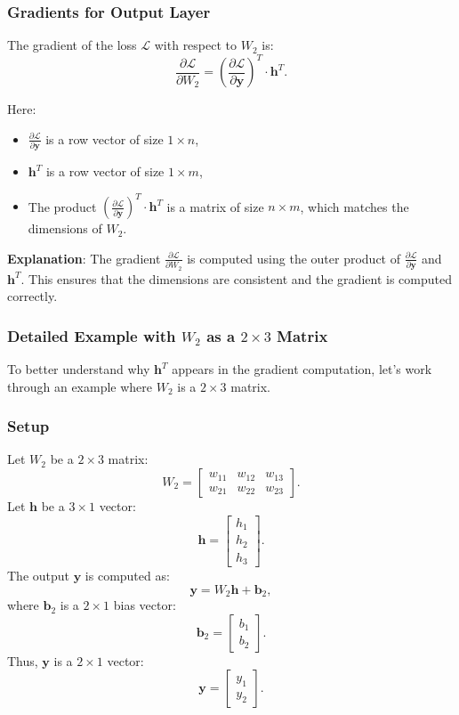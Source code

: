 \begin{notechapter}
\subsubsection{Gradients for Output Layer}
The gradient of the loss \( \mathcal{L} \) with respect to \( W_2 \) is:
\[
\frac{\partial \mathcal{L}}{\partial W_2} = \left( \frac{\partial \mathcal{L}}{\partial \mathbf{y}} \right)^T \cdot \mathbf{h}^T.
\]

Here:
\begin{itemize}
    \item \( \frac{\partial \mathcal{L}}{\partial \mathbf{y}} \) is a row vector of size \( 1 \times n \),
    \item \( \mathbf{h}^T \) is a row vector of size \( 1 \times m \),
    \item The product \( \left( \frac{\partial \mathcal{L}}{\partial \mathbf{y}} \right)^T \cdot \mathbf{h}^T \) is a matrix of size \( n \times m \), which matches the dimensions of \( W_2 \).
\end{itemize}

\textbf{Explanation}:
The gradient \( \frac{\partial \mathcal{L}}{\partial W_2} \) is computed using the outer product of \( \frac{\partial \mathcal{L}}{\partial \mathbf{y}} \) and \( \mathbf{h}^T \). This ensures that the dimensions are consistent and the gradient is computed correctly.

\subsubsection{Detailed Example with \( W_2 \) as a \( 2 \times 3 \) Matrix}
To better understand why \( \mathbf{h}^T \) appears in the gradient computation, let's work through an example where \( W_2 \) is a \( 2 \times 3 \) matrix.

\subsubsection{Setup}
Let \( W_2 \) be a \( 2 \times 3 \) matrix:
\[
W_2 = \begin{bmatrix}
w_{11} & w_{12} & w_{13} \\
w_{21} & w_{22} & w_{23}
\end{bmatrix}.
\]
Let \( \mathbf{h} \) be a \( 3 \times 1 \) vector:
\[
\mathbf{h} = \begin{bmatrix}
h_1 \\
h_2 \\
h_3
\end{bmatrix}.
\]
The output \( \mathbf{y} \) is computed as:
\[
\mathbf{y} = W_2 \mathbf{h} + \mathbf{b}_2,
\]
where \( \mathbf{b}_2 \) is a \( 2 \times 1 \) bias vector:
\[
\mathbf{b}_2 = \begin{bmatrix}
b_1 \\
b_2
\end{bmatrix}.
\]
Thus, \( \mathbf{y} \) is a \( 2 \times 1 \) vector:
\[
\mathbf{y} = \begin{bmatrix}
y_1 \\
y_2
\end{bmatrix}.
\]


\end{notechapter}
